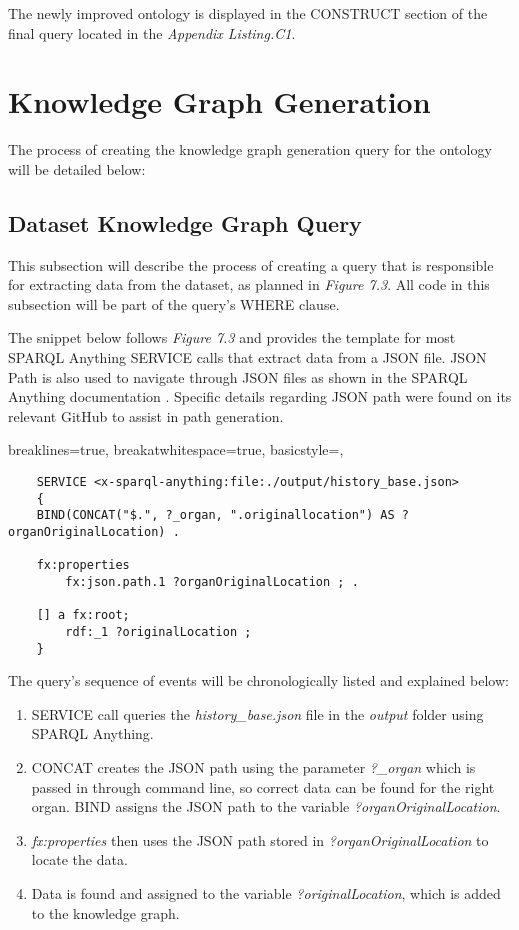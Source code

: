 The newly improved ontology is displayed in the CONSTRUCT section of the final query located in the \textit{Appendix Listing.C1}.

\section{Knowledge Graph Generation}
\hspace*{0.5cm} The process of creating the knowledge graph generation query for the ontology will be detailed below:

\subsection{Dataset Knowledge Graph Query}
\hspace*{0.5cm} This subsection will describe the process of creating a query that is responsible for extracting data from the dataset, as planned in \textit{Figure 7.3}. All code in this subsection will be part of the query's WHERE clause. 

The snippet below follows \textit{Figure 7.3} and provides the template for most SPARQL Anything SERVICE calls that extract data from a JSON file. JSON Path is also used to navigate through JSON files as shown in the SPARQL Anything documentation \cite{sparqlanythinggithub}. Specific details regarding JSON path were found on its relevant GitHub \cite{jsonpath} to assist in path generation. 

\lstset
{
    breaklines=true,
    breakatwhitespace=true,
    basicstyle=\linespread{1.5}\ttfamily,
}
\begin{lstlisting}
    SERVICE <x-sparql-anything:file:./output/history_base.json> 
    {
    BIND(CONCAT("$.", ?_organ, ".originallocation") AS ?organOriginalLocation) .

    fx:properties
        fx:json.path.1 ?organOriginalLocation ; .

    [] a fx:root; 
        rdf:_1 ?originalLocation ;
    } 
\end{lstlisting}

The query's sequence of events will be chronologically listed and explained below:

\begin{enumerate}
    \item SERVICE call queries the \textit{history\_base.json} file in the \textit{output} folder using SPARQL Anything. 
    \item CONCAT creates the JSON path using the parameter \textit{?\_organ} which is passed in through command line, so correct data can be found for the right organ. BIND assigns the JSON path to the variable \textit{?organOriginalLocation}.
    \item \textit{fx:properties} then uses the JSON path stored in \textit{?organOriginalLocation} to locate the data.
    \item Data is found and assigned to the variable \textit{?originalLocation}, which is added to the knowledge graph.
\end{enumerate}

